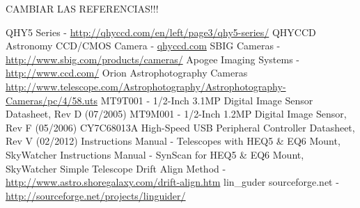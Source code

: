 \documentclass[a4paper,10pt]{article}
\begin{document}
CAMBIAR LAS REFERENCIAS!!!
\begin{thebibliography}{99}
 QHY5 Series - \url{http://qhyccd.com/en/left/page3/qhy5-series/}
 QHYCCD Astronomy CCD/CMOS Camera - \url{qhyccd.com}
 SBIG Cameras - \url{http://www.sbig.com/products/cameras/}
 Apogee Imaging Systems - \url{http://www.ccd.com/}
 Orion Astrophotography Cameras\\ \url{http://www.telescope.com/Astrophotography/Astrophotography-Cameras/pc/4/58.uts}
 MT9T001 - 1/2-Inch 3.1MP Digital Image Sensor Datasheet, Rev D (07/2005)
 MT9M001 - 1/2-Inch 1.2MP Digital Image Sensor, Rev F (05/2006)
 CY7C68013A High-Speed USB Peripheral Controller Datasheet, Rev V (02/2012)
 Instructions Manual - Telescopes with HEQ5 \& EQ6 Mount, SkyWatcher
 Instructions Manual - SynScan for HEQ5 \& EQ6 Mount, SkyWatcher 
 Simple Telescope Drift Align Method - \url{http://www.astro.shoregalaxy.com/drift-align.htm}
 lin\_guder \@ sourceforge.net - \url{http://sourceforge.net/projects/linguider/}
\end{thebibliography}
\end{document}
